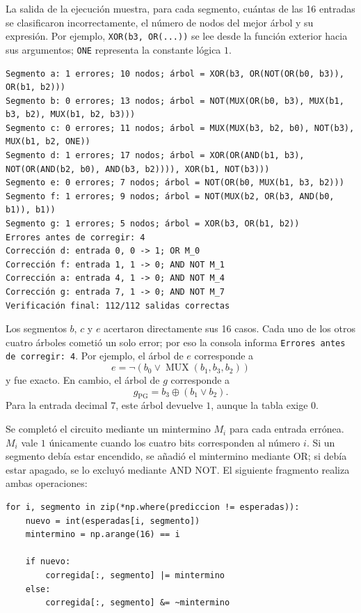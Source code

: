 \documentclass[14pt,twoside]{article}
\begin{document}
La salida de la ejecución muestra, para cada segmento, cuántas de las 16 entradas se clasificaron incorrectamente, el número de nodos del mejor árbol y su expresión. Por ejemplo, \texttt{XOR(b3, OR(...))} se lee desde la función exterior hacia sus argumentos; \texttt{ONE} representa la constante lógica \(1\).

\begin{lstlisting}[style=pgterminal,caption={Resultados de la evolución y verificación final.}]
Segmento a: 1 errores; 10 nodos; árbol = XOR(b3, OR(NOT(OR(b0, b3)), OR(b1, b2)))
Segmento b: 0 errores; 13 nodos; árbol = NOT(MUX(OR(b0, b3), MUX(b1, b3, b2), MUX(b1, b2, b3)))
Segmento c: 0 errores; 11 nodos; árbol = MUX(MUX(b3, b2, b0), NOT(b3), MUX(b1, b2, ONE))
Segmento d: 1 errores; 17 nodos; árbol = XOR(OR(AND(b1, b3), NOT(OR(AND(b2, b0), AND(b3, b2)))), XOR(b1, NOT(b3)))
Segmento e: 0 errores; 7 nodos; árbol = NOT(OR(b0, MUX(b1, b3, b2)))
Segmento f: 1 errores; 9 nodos; árbol = NOT(MUX(b2, OR(b3, AND(b0, b1)), b1))
Segmento g: 1 errores; 5 nodos; árbol = XOR(b3, OR(b1, b2))
Errores antes de corregir: 4
Corrección d: entrada 0, 0 -> 1; OR M_0
Corrección f: entrada 1, 1 -> 0; AND NOT M_1
Corrección a: entrada 4, 1 -> 0; AND NOT M_4
Corrección g: entrada 7, 1 -> 0; AND NOT M_7
Verificación final: 112/112 salidas correctas
\end{lstlisting}

Los segmentos \(b\), \(c\) y \(e\) acertaron directamente sus 16 casos. Cada uno de los otros cuatro árboles cometió un solo error; por eso la consola informa \texttt{Errores antes de corregir: 4}. Por ejemplo, el árbol de \(e\) corresponde a
\[
e=\neg\!\left(b_0\lor\operatorname{MUX}(b_1,b_3,b_2)\right)
\]
y fue exacto. En cambio, el árbol de \(g\) corresponde a
\[
g_{\mathrm{PG}}=b_3\oplus(b_1\lor b_2).
\]
Para la entrada decimal \(7\), este árbol devuelve \(1\), aunque la tabla exige \(0\).

Se completó el circuito mediante un mintermino \(M_i\) para cada entrada errónea. \(M_i\) vale \(1\) únicamente cuando los cuatro bits corresponden al número \(i\). Si un segmento debía estar encendido, se añadió el mintermino mediante OR; si debía estar apagado, se lo excluyó mediante AND NOT. El siguiente fragmento realiza ambas operaciones:

\begin{lstlisting}[style=pgpython,caption={Corrección de las entradas en las que falla el árbol evolucionado.}]
for i, segmento in zip(*np.where(prediccion != esperadas)):
    nuevo = int(esperadas[i, segmento])
    mintermino = np.arange(16) == i

    if nuevo:
        corregida[:, segmento] |= mintermino
    else:
        corregida[:, segmento] &= ~mintermino
\end{lstlisting}
\end{document}
